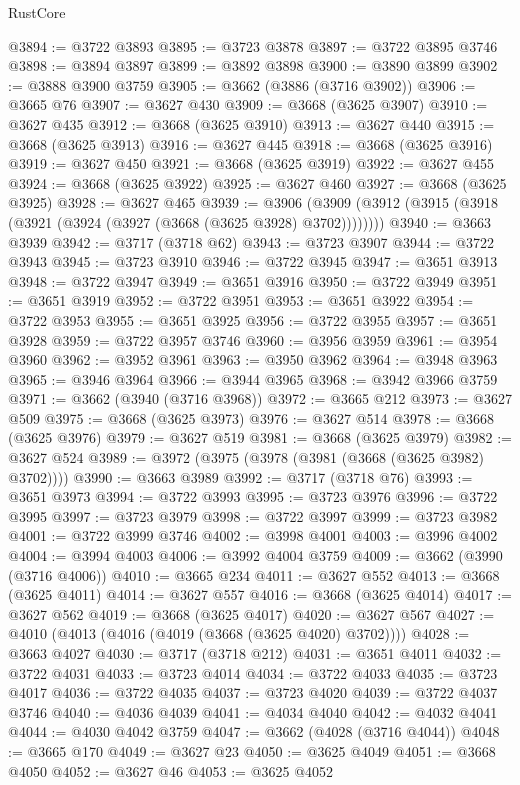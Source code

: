 \begin{lexlean}{RustCore}
\begin{coremodule}
@3894 := @3722 @3893
@3895 := @3723 @3878
@3897 := @3722 @3895 @3746
@3898 := @3894 @3897
@3899 := @3892 @3898
@3900 := @3890 @3899
@3902 := @3888 @3900 @3759
@3905 := @3662 (@3886 (@3716 @3902))
@3906 := @3665 @76
@3907 := @3627 @430
@3909 := @3668 (@3625 @3907)
@3910 := @3627 @435
@3912 := @3668 (@3625 @3910)
@3913 := @3627 @440
@3915 := @3668 (@3625 @3913)
@3916 := @3627 @445
@3918 := @3668 (@3625 @3916)
@3919 := @3627 @450
@3921 := @3668 (@3625 @3919)
@3922 := @3627 @455
@3924 := @3668 (@3625 @3922)
@3925 := @3627 @460
@3927 := @3668 (@3625 @3925)
@3928 := @3627 @465
@3939 := @3906 (@3909 (@3912 (@3915 (@3918 (@3921 (@3924 (@3927 (@3668 (@3625 @3928) @3702))))))))
@3940 := @3663 @3939
@3942 := @3717 (@3718 @62)
@3943 := @3723 @3907
@3944 := @3722 @3943
@3945 := @3723 @3910
@3946 := @3722 @3945
@3947 := @3651 @3913
@3948 := @3722 @3947
@3949 := @3651 @3916
@3950 := @3722 @3949
@3951 := @3651 @3919
@3952 := @3722 @3951
@3953 := @3651 @3922
@3954 := @3722 @3953
@3955 := @3651 @3925
@3956 := @3722 @3955
@3957 := @3651 @3928
@3959 := @3722 @3957 @3746
@3960 := @3956 @3959
@3961 := @3954 @3960
@3962 := @3952 @3961
@3963 := @3950 @3962
@3964 := @3948 @3963
@3965 := @3946 @3964
@3966 := @3944 @3965
@3968 := @3942 @3966 @3759
@3971 := @3662 (@3940 (@3716 @3968))
@3972 := @3665 @212
@3973 := @3627 @509
@3975 := @3668 (@3625 @3973)
@3976 := @3627 @514
@3978 := @3668 (@3625 @3976)
@3979 := @3627 @519
@3981 := @3668 (@3625 @3979)
@3982 := @3627 @524
@3989 := @3972 (@3975 (@3978 (@3981 (@3668 (@3625 @3982) @3702))))
@3990 := @3663 @3989
@3992 := @3717 (@3718 @76)
@3993 := @3651 @3973
@3994 := @3722 @3993
@3995 := @3723 @3976
@3996 := @3722 @3995
@3997 := @3723 @3979
@3998 := @3722 @3997
@3999 := @3723 @3982
@4001 := @3722 @3999 @3746
@4002 := @3998 @4001
@4003 := @3996 @4002
@4004 := @3994 @4003
@4006 := @3992 @4004 @3759
@4009 := @3662 (@3990 (@3716 @4006))
@4010 := @3665 @234
@4011 := @3627 @552
@4013 := @3668 (@3625 @4011)
@4014 := @3627 @557
@4016 := @3668 (@3625 @4014)
@4017 := @3627 @562
@4019 := @3668 (@3625 @4017)
@4020 := @3627 @567
@4027 := @4010 (@4013 (@4016 (@4019 (@3668 (@3625 @4020) @3702))))
@4028 := @3663 @4027
@4030 := @3717 (@3718 @212)
@4031 := @3651 @4011
@4032 := @3722 @4031
@4033 := @3723 @4014
@4034 := @3722 @4033
@4035 := @3723 @4017
@4036 := @3722 @4035
@4037 := @3723 @4020
@4039 := @3722 @4037 @3746
@4040 := @4036 @4039
@4041 := @4034 @4040
@4042 := @4032 @4041
@4044 := @4030 @4042 @3759
@4047 := @3662 (@4028 (@3716 @4044))
@4048 := @3665 @170
@4049 := @3627 @23
@4050 := @3625 @4049
@4051 := @3668 @4050
@4052 := @3627 @46
@4053 := @3625 @4052

\end{coremodule}
\end{lexlean}
